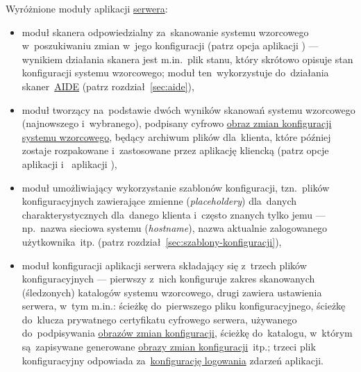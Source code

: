 \documentclass[thesis]{subfiles}
\begin{document}
Wyróżnione moduły aplikacji \hyperref[sec:srv-app]{serwera}:\mynobreakpar
\begin{itemize}
	\item moduł skanera odpowiedzialny za~skanowanie systemu wzorcowego w~poszukiwaniu zmian w~jego konfiguracji (patrz opcja  aplikacji \texttt{\srvappname}) --- wynikiem działania skanera jest m.in.~plik stanu, który skrótowo opisuje stan konfiguracji systemu wzorcowego; moduł ten~wykorzystuje do~działania skaner~\hyperref[sec:aide]{AIDE} (patrz rozdział~\ref{sec:aide}),
	\item moduł tworzący na~podstawie dwóch wyników skanowań systemu wzorcowego (najnowszego i~wybranego), podpisany cyfrowo \hyperref[sec:obraz-zmian-konfiguracji]{obraz zmian konfiguracji systemu wzorcowego}, będący archiwum plików dla~klienta, które później zostaje rozpakowane i~zastosowane przez aplikację kliencką (patrz opcje  aplikacji \texttt{\srvappname{}} i~ aplikacji \texttt{\cliappname{}}),
	\item moduł umożliwiający wykorzystanie szablonów konfiguracji, tzn.~plików konfiguracyjnych zawierające zmienne (\emph{placeholdery}) dla~danych charakterystycznych dla~danego klienta i~często znanych tylko jemu --- np.~nazwa sieciowa systemu (\emph{hostname}), nazwa aktualnie zalogowanego użytkownika~itp. (patrz rozdział~\ref{sec:szablony-konfiguracji}),
	\item moduł konfiguracji aplikacji serwera składający się z~trzech plików konfiguracyjnych --- pierwszy z~nich konfiguruje zakres skanowanych (śledzonych) katalogów systemu wzorcowego, drugi zawiera ustawienia serwera, w~tym m.in.: ścieżkę do~pierwszego pliku konfiguracyjnego, ścieżkę do~klucza prywatnego certyfikatu cyfrowego serwera, używanego do~podpisywania \hyperref[sec:obraz-zmian-konfiguracji]{obrazów zmian konfiguracji}, ścieżkę do~katalogu, w~którym są~zapisywane generowane \hyperref[sec:obraz-zmian-konfiguracji]{obrazy zmian konfiguracji}~itp.; trzeci plik konfiguracyjny odpowiada za~\href{https://docs.python.org/dev/library/logging.config.html}{konfigurację logowania} zdarzeń aplikacji.
\end{itemize}
\end{document}
